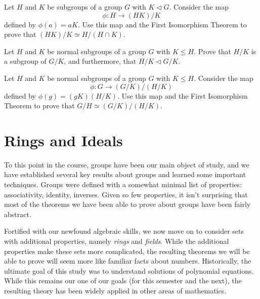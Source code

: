 \begin{problem}\label{prob:2it}
Let \(H\) and \(K\) be subgroups of a group \(G\) with \(K \lhd G\). Consider the map \[\phi : H \longrightarrow (HK)/K\] defined by \(\phi(a) = aK\). Use this map and the First Isomorphism Theorem to prove that \((HK)/K \simeq H/(H\cap K)\).
\begin{annotation}
\end{annotation}
\end{problem}

\begin{problem}
Let \(H\) and \(K\) be normal subgroups of a group \(G\) with \(K \leq H\). Prove that \(H/K\) is a subgroup of \(G/K\), and furthermore, that \(H/K \lhd G/K\).
\end{problem}

\begin{problem}\label{prob:3it}
Let \(H\) and \(K\) be normal subgroups of a group \(G\) with \(K \leq H\). Consider the map \[\phi : G \longrightarrow (G/K)/(H/K)\] defined by \(\phi(g) = (gK)(H/K)\). Use this map and the First Isomorphism Theorem to prove that \(G/H \simeq (G/K)/(H/K)\).
\begin{annotation}
\end{annotation}
\end{problem}

\chapter{Rings and Ideals}
To this point in the course, groups have been our main object of study, and we have established several key results about groups and learned some important techniques. Groups were defined with a somewhat minimal list of properties: associativity, identity, inverses. Given so few properties, it isn't surprising that most of the theorems we have been able to prove about groups have been fairly abstract.

Fortified with our newfound algebraic skills, we now move on to consider sets with additional properties, namely \emph{rings} and \emph{fields}. While the additional properties make these sets more complicated, the resulting theorems we will be able to prove will seem more like familiar facts about numbers. Historically, the ultimate goal of this study was to understand solutions of polynomial equations. While this remains our one of our goals (for this semester and the next), the resulting theory has been widely applied in other areas of mathematics.

